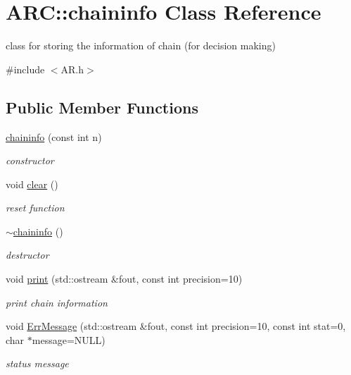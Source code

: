 \hypertarget{classARC_1_1chaininfo}{}\section{A\+RC\+:\+:chaininfo Class Reference}
\label{classARC_1_1chaininfo}


class for storing the information of chain (for decision making)  




{\ttfamily \#include $<$A\+R.\+h$>$}

\subsection*{Public Member Functions}
\begin{DoxyCompactItemize}
\item 
\hyperlink{classARC_1_1chaininfo_a443631a28e2cd66512683df4669088eb}{chaininfo} (const int n)
\begin{DoxyCompactList}\small\item\em constructor \end{DoxyCompactList}\item 
void \hyperlink{classARC_1_1chaininfo_ae65957f4d894671dd467a376b898e1a5}{clear} ()
\begin{DoxyCompactList}\small\item\em reset function \end{DoxyCompactList}\item 
\hyperlink{classARC_1_1chaininfo_aca51a64943e31e1ac33473fb90c39a17}{$\sim$chaininfo} ()
\begin{DoxyCompactList}\small\item\em destructor \end{DoxyCompactList}\item 
void \hyperlink{classARC_1_1chaininfo_a75c849e7360a20d88934079a8f5d75f4}{print} (std\+::ostream \&fout, const int precision=10)
\begin{DoxyCompactList}\small\item\em print chain information \end{DoxyCompactList}\item 
void \hyperlink{classARC_1_1chaininfo_a07ad3dcb9540f02984195045357166b0}{Err\+Message} (std\+::ostream \&fout, const int precision=10, const int stat=0, char $\ast$message=N\+U\+LL)
\begin{DoxyCompactList}\small\item\em status message \end{DoxyCompactList}\end{DoxyCompactItemize}
